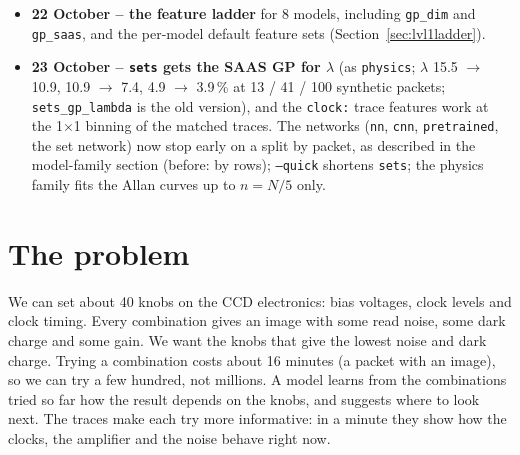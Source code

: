 \documentclass[10pt]{article}
\newcommand{\code}[1]{\texttt{#1}}
\begin{document}
\begin{itemize}
  features grew from 85 to 141 scalars and from 14 to 18 curves, sorted into tiers; a synthetic tolerance test, learned feature
  importance and the protected tier P were added (Section~\ref{sec:lvl1feat}).
\item \textbf{22 October -- the feature ladder} for 8 models, including \code{gp\_dim} and \code{gp\_saas}, and the per-model default
  feature sets (Section~\ref{sec:lvl1ladder}).
\item \textbf{23 October -- \code{sets} gets the SAAS GP for $\lambda$} (as \code{physics}; $\lambda$ 15.5 $\to$ 10.9,
  10.9 $\to$ 7.4, 4.9 $\to$ 3.9\,\% at 13 / 41 / 100 synthetic packets; \code{sets\_gp\_lambda} is the old version), and the
  \code{clock:} trace features work at the 1$\times$1 binning of the matched traces. The networks (\code{nn}, \code{cnn},
  \code{pretrained}, the set network) now stop early on a split by packet, as described in the model-family section (before:
  by rows); \code{--quick} shortens \code{sets}; the physics family fits the Allan curves up to $n = N/5$ only.
\end{itemize}

\section{The problem}

\begin{basic}
We can set about 40 knobs on the CCD electronics: bias voltages, clock levels and clock timing. Every combination gives an image
with some read noise, some dark charge and some gain. We want the knobs that give the lowest noise and dark charge. Trying a
combination costs about 16 minutes (a packet with an image), so we can try a few hundred, not millions. A model learns from the
combinations tried so far how the result depends on the knobs, and suggests where to look next. The traces make each try more
informative: in a minute they show how the clocks, the amplifier and the noise behave right now.
\end{basic}
\end{document}
